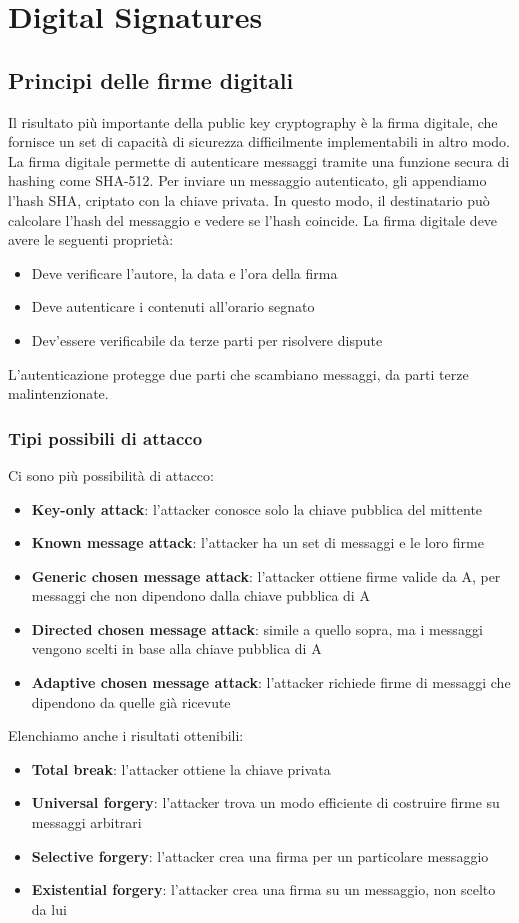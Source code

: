 \documentclass[11pt]{article}
\begin{document}
\section{Digital Signatures}
\subsection{Principi delle firme digitali}
Il risultato più importante della public key cryptography è la firma digitale, che fornisce un set di capacità di sicurezza difficilmente implementabili in altro modo. La firma digitale permette di autenticare messaggi tramite una funzione secura di hashing come SHA-512. 
Per inviare un messaggio autenticato, gli appendiamo l'hash SHA, criptato con la chiave privata. In questo modo, il destinatario può calcolare l'hash del messaggio e vedere se l'hash coincide.
La firma digitale deve avere le seguenti proprietà:
\begin{itemize}
    \item Deve verificare l'autore, la data e l'ora della firma
    \item Deve autenticare i contenuti all'orario segnato
    \item Dev'essere verificabile da terze parti per risolvere dispute
\end{itemize}
L'autenticazione protegge due parti che scambiano messaggi, da parti terze malintenzionate.
\subsubsection{Tipi possibili di attacco}
Ci sono più possibilità di attacco:
\begin{itemize}
    \item \textbf{Key-only attack}: l'attacker conosce solo la chiave pubblica del mittente
    \item \textbf{Known message attack}: l'attacker ha un set di messaggi e le loro firme
    \item \textbf{Generic chosen message attack}: l'attacker ottiene firme valide da A, per messaggi che non dipendono dalla chiave pubblica di A
    \item \textbf{Directed chosen message attack}: simile a quello sopra, ma i messaggi vengono scelti in base alla chiave pubblica di A
    \item \textbf{Adaptive chosen message attack}: l'attacker richiede firme di messaggi che dipendono da quelle già ricevute
\end{itemize}
Elenchiamo anche i risultati ottenibili:
\begin{itemize}
    \item \textbf{Total break}: l'attacker ottiene la chiave privata
    \item \textbf{Universal forgery}: l'attacker trova un modo efficiente di costruire firme su messaggi arbitrari
    \item \textbf{Selective forgery}: l'attacker crea una firma per un particolare messaggio 
    \item \textbf{Existential forgery}: l'attacker crea una firma su un messaggio, non scelto da lui
\end{itemize}
\end{document}
